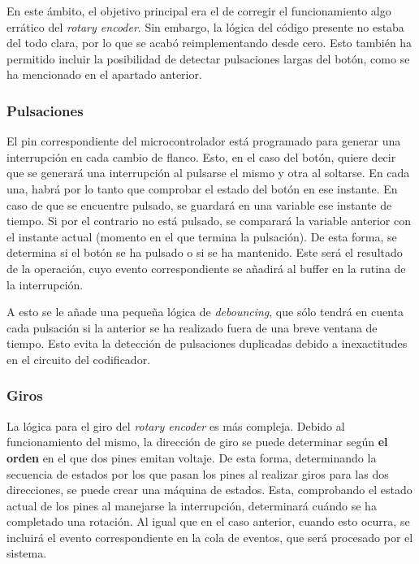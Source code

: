 En este ámbito, el objetivo principal era el de corregir el funcionamiento algo errático del \textit{rotary encoder}. Sin embargo, la lógica del código presente no estaba del todo clara, por lo que se acabó reimplementando desde cero. Esto también ha permitido incluir la posibilidad de detectar pulsaciones largas del botón, como se ha mencionado en el apartado anterior.

\subsubsection{Pulsaciones}

El pin correspondiente del microcontrolador está programado para generar una interrupción en cada cambio de flanco. Esto, en el caso del botón, quiere decir que se generará una interrupción al pulsarse el mismo y otra al soltarse. En cada una, habrá por lo tanto que comprobar el estado del botón en ese instante. En caso de que se encuentre pulsado, se guardará en una variable ese instante de tiempo. Si por el contrario no está pulsado, se comparará la variable anterior con el instante actual (momento en el que termina la pulsación). De esta forma, se determina si el botón se ha pulsado o si se ha mantenido. Este será el resultado de la operación, cuyo evento correspondiente se añadirá al buffer en la rutina de la interrupción.

A esto se le añade una pequeña lógica de \textit{debouncing}, que sólo tendrá en cuenta cada pulsación si la anterior se ha realizado fuera de una breve ventana de tiempo. Esto evita la detección de pulsaciones duplicadas debido a inexactitudes en el circuito del codificador.

\subsubsection{Giros}

La lógica para el giro del \textit{rotary encoder} es más compleja. Debido al funcionamiento del mismo, la dirección de giro se puede determinar según \textbf{el orden} en el que dos pines emitan voltaje. De esta forma, determinando la secuencia de estados por los que pasan los pines al realizar giros para las dos direcciones, se puede crear una máquina de estados. Esta, comprobando el estado actual de los pines al manejarse la interrupción, determinará cuándo se ha completado una rotación. Al igual que en el caso anterior, cuando esto ocurra, se incluirá el evento correspondiente en la cola de eventos, que será procesado por el sistema.

